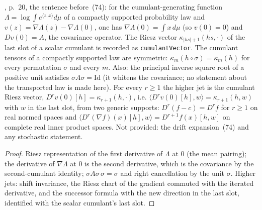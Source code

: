 \begin{lemma}
  \label{lem:bkl-cgf-gradient-jets}
  \leanok
  \cite{BizeulKlartagLehec2026}, p.~20, the sentence before~(74): for the cumulant-generating function
  $\Lambda=\log\int e^{\langle z,x\rangle}d\mu$ of a compactly supported probability law and
  $v(z)=\nabla\Lambda(z)-\nabla\Lambda(0)$, one has $\nabla\Lambda(0)=\int x\,d\mu$ (so $v(0)=0$) and
  $Dv(0)=A$, the covariance operator.  The Riesz vector $\kappa_{|hs|+1}(hs,\cdot)$ of the last slot of a
  scalar cumulant is recorded as \texttt{cumulantVector}.  The cumulant tensors of a compactly supported law are
  symmetric: $\kappa_m(h\circ\sigma)=\kappa_m(h)$ for every permutation $\sigma$ and every $m$.  Also: the principal inverse square root of a positive
  unit satisfies $\sigma A\sigma=\mathrm{Id}$ (it whitens the covariance; no statement about the transported law is
  made here).  For every $r\ge1$ the higher jet is the cumulant Riesz vector,
  $D^rv(0)[h]=\kappa_{r+1}(h,\cdot)$, i.e. $\langle D^rv(0)[h],w\rangle=\kappa_{r+1}(h,w)$ with $w$ in the last slot,
  from two generic supports: $D^r(f-c)=D^rf$ for $r\ge1$ on real normed spaces and
  $\langle D^r(\nabla f)(x)[h],w\rangle=D^{r+1}f(x)[h,w]$ on complete real inner product spaces.  Not provided: the
  drift expansion~(74) and any stochastic statement.
\end{lemma}
\begin{proof}
  \leanok
  Riesz representation of the first derivative of $\Lambda$ at $0$ (the mean pairing); the derivative of
  $\nabla\Lambda$ at $0$ is the second derivative, which is the covariance by the second-cumulant identity;
  $\sigma A\sigma\,\sigma=\sigma$ and right cancellation by the unit $\sigma$.  Higher jets: shift invariance,
  the Riesz chart of the gradient commuted with the iterated derivative, and the successor formula with the new
  direction in the last slot, identified with the scalar cumulant's last slot.
\end{proof}

